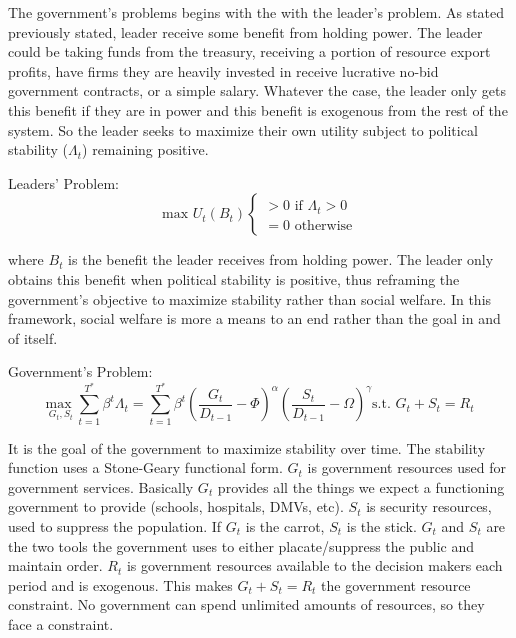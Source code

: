 \documentclass[12pt]{article}
\begin{document}
\begin{spacing}{1.5}
The government's problems begins with the with the leader's problem. As stated previously stated, leader receive some benefit from holding power. The leader could be taking funds from the treasury, receiving a portion of resource export profits, have firms they are heavily invested in receive lucrative no-bid government contracts, or a simple salary. Whatever the case, the leader only gets this benefit if they are in power and this benefit is exogenous from the rest of the system. So the leader seeks to maximize their own utility subject to political stability ($\Lambda_t$) remaining positive. 


\vspace{.5 em}
\noindent Leaders' Problem:
\begin{equation}
	 \text{max } U_t(B_t) \begin{cases}
		>0 \text{ if } \Lambda_t > 0 \\
		= 0 \text{ otherwise} 	
	\end{cases}
\end{equation} 

\noindent where $B_t$ is the benefit the leader receives from holding power. The leader only obtains this benefit when political stability is positive, thus reframing the government's objective to maximize stability rather than social welfare. In this framework, social welfare is more a means to an end rather than the goal in and of itself. 


\vspace{.5 em}

\noindent Government's Problem:
\begin{equation}
{\underset{G_t,S_t}{\text{max }}} \sum\limits_{t=1}^{T^*} \beta^t {\Lambda}_t = \sum\limits_{t=1}^{T^*} \beta^t\left(\frac{G_t}{D_{t-1}}-\Phi\right)^\alpha \left(\frac{S_t}{D_{t-1}}-\Omega\right)^\gamma   \text{s.t. } G_t+S_t=R_t
\end{equation}

It is the goal of the government to maximize stability over time. The stability function uses a Stone-Geary functional form. $G_t$ is government resources used for government services. Basically $G_t$ provides all the things we expect a functioning government to provide (schools, hospitals, DMVs, etc). $S_t$ is security resources, used to suppress the population. If $G_t$ is the carrot, $S_t$ is the stick. $G_t$ and $S_t$ are the two tools the government uses to either placate/suppress the public and maintain order. $R_t$ is government resources available to the decision makers each period and is exogenous. This makes $G_t+S_t=R_t$ the government resource constraint. No government can spend unlimited amounts of resources, so they face a constraint. 


\end{spacing}
\end{document}
